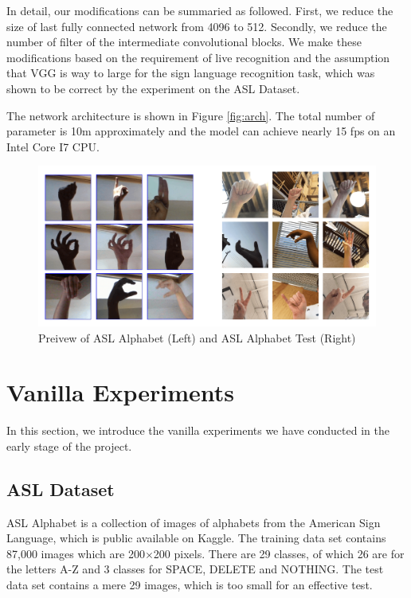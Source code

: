 \documentclass[10pt,twocolumn,letterpaper]{article}
\begin{document}
In detail, our modifications can be summaried as followed. First, we reduce the size of last fully connected network from 4096 to 512. Secondly, we reduce the number of filter of the intermediate convolutional blocks. We make these modifications based on the requirement of live recognition and the assumption that VGG is way to large for the sign language recognition task, which was shown to be correct by the experiment on the ASL Dataset.

The network architecture is shown in Figure \ref{fig:arch}. The total number of parameter is 10m approximately and the model can achieve nearly 15 fps on an Intel Core I7 CPU.  

\begin{figure}[h]
\begin{center}
\includegraphics[width=0.8\linewidth]{imgs/asl-cmp.png}
\end{center}
\caption{Preivew of ASL Alphabet (Left) and ASL Alphabet Test (Right)}
\label{fig:asl}
\end{figure}



\section{Vanilla Experiments}

In this section, we introduce the vanilla experiments we have conducted in the early stage of the project.


\subsection{ASL Dataset}

ASL Alphabet\cite{noauthor_asl_nodate} is a collection of images of alphabets from the American Sign Language, which is public available on Kaggle. The training data set contains 87,000 images which are 200$\times$200 pixels. There are 29 classes, of which 26 are for the letters A-Z and 3 classes for SPACE, DELETE and NOTHING. The test data set contains a mere 29 images, which is too small for an effective test.
\end{document}
